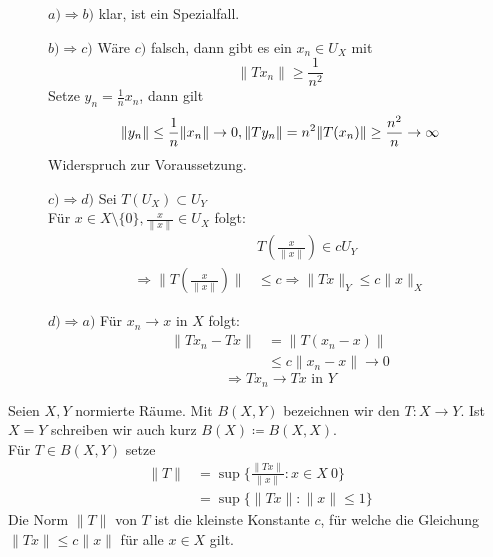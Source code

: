 \begin{beweis}
	\begin{description}
		\item[] $a) \Rightarrow b)$ klar, ist ein Spezialfall.
		\item[] $b) \Rightarrow c)$ Wäre $c)$ falsch, dann gibt es ein $x_{n} \in U_{X}$ mit 
		\[ \| T x_{n} \| \geq \frac{1}{n^{2}} \]
		Setze $y_{n} = \frac{1}{n} x_{n}$, dann gilt
		\[
			\| y_{n} \| \leq \frac{1}{n} \| x_{n} \| \rightarrow 0, \\
			\| T y_{n} \| = n^{2} \| T(x_{n}) \| \geq \frac{n^2}{n} \rightarrow \infty 
		 \]
		 Widerspruch zur Voraussetzung.
		 \item[] $c) \Rightarrow d)$ Sei $T(U_{X}) \subset U_{Y}$ \\
		 Für $x \in X \setminus \{0\}, \frac{x}{\| x \|} \in U_{X}$ folgt:
		 \begin{align*}
		 	&T \left( \frac{x}{\| x \|} \right) \in c U_{Y} \\
		 	\Rightarrow \| T \left( \frac{x}{\| x \|} \right) \| & \leq c
		 	\Rightarrow \| T x \|_{Y} \leq c \| x \|_{X}			
		 \end{align*}
		 \item[] $d) \Rightarrow a)$ Für $x_{n} \rightarrow x$ in $X$ folgt:
		 \begin{align*}
		 	\| T x_{n} - T x \| & = \| T ( x_{n} - x ) \| \\
		 						& \leq c \| x_{n} - x \| \rightarrow 0
		 \end{align*} \[ \Rightarrow T x_{n} \rightarrow T x \text{ in } Y \]
	\end{description}
\end{beweis}
	
	
\begin{definition}
	Seien $X, Y$ normierte Räume. Mit $B(X, Y)$ bezeichnen wir den  $T: X \rightarrow Y$. Ist $ X = Y$ schreiben wir auch kurz $B(X) \coloneqq B(X, X)$. \\
	
	Für $T \in B(X, Y)$ setze
	\begin{align*}
		\| T \| & = \sup \{ \frac{\| Tx \|}{\| x \|}: x \in X \ {0} \} \\
				& = \sup \{ \| Tx \|: \| x \| \leq 1 \}
	\end{align*}
	Die Norm $\| T \|$ von $T$ ist die kleinste Konstante $c$, für welche die Gleichung $\| Tx \| \leq c \| x \|$ für alle $x \in X$ gilt.
\end{definition}


